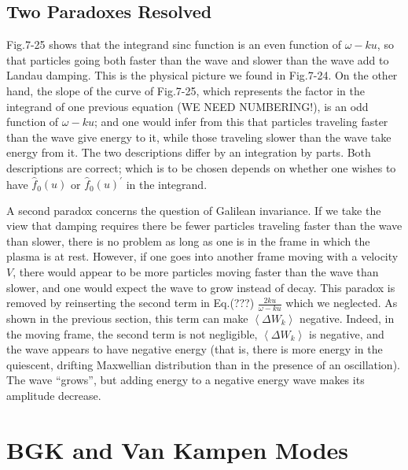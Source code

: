 \documentclass[
  notoc %
]{tufte-book}
\begin{document}
\hypertarget{two-paradoxes-resolved}{%
\subsection{Two Paradoxes Resolved}\label{two-paradoxes-resolved}}

Fig.7-25 shows that the integrand sinc function is an even function of
\(\omega-ku\), so that particles going both faster than the wave and
slower than the wave add to Landau damping. This is the physical picture
we found in Fig.7-24. On the other hand, the slope of the curve of
Fig.7-25, which represents the factor in the integrand of one previous
equation (WE NEED NUMBERING!), is an odd function of \(\omega-ku\); and
one would infer from this that particles traveling faster than the wave
give energy to it, while those traveling slower than the wave take
energy from it. The two descriptions differ by an integration by parts.
Both descriptions are correct; which is to be chosen depends on whether
one wishes to have \(\hat{f}_0(u)\) or \(\hat{f}_0(u)^\prime\) in the
integrand.

A second paradox concerns the question of Galilean invariance. If we
take the view that damping requires there be fewer particles traveling
faster than the wave than slower, there is no problem as long as one is
in the frame in which the plasma is at rest. However, if one goes into
another frame moving with a velocity \(V\), there would appear to be
more particles moving faster than the wave than slower, and one would
expect the wave to grow instead of decay. This paradox is removed by
reinserting the second term in Eq.(???) \(\frac{2ku}{\omega-ku}\) which
we neglected. As shown in the previous section, this term can make
\(\left< \Delta W_k \right>\) negative. Indeed, in the moving frame, the
second term is not negligible, \(\left< \Delta W_k \right>\) is
negative, and the wave appears to have negative energy (that is, there
is more energy in the quiescent, drifting Maxwellian distribution than
in the presence of an oscillation). The wave ``grows'', but adding
energy to a negative energy wave makes its amplitude decrease.

\hypertarget{bgk-and-van-kampen-modes}{%
\section{BGK and Van Kampen Modes}\label{bgk-and-van-kampen-modes}}
\end{document}
